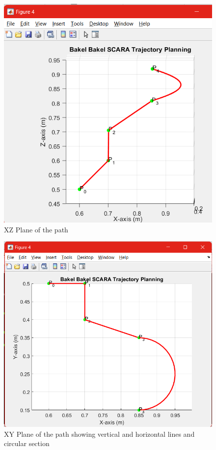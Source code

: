 \documentclass[12pt]{report}
\begin{document}
	\begin{figure}[H]
		\centering
		\includegraphics[scale=0.8]{T1} %
		\caption{XZ Plane of the path}
		\label{run10} %
	\end{figure}
	\begin{figure}[H]
		\centering
		\includegraphics[scale=0.8]{T2} %
		\caption{XY Plane of the path showing vertical and horizontal lines and circular section}
		\label{run10} %
	\end{figure}
\end{document}
